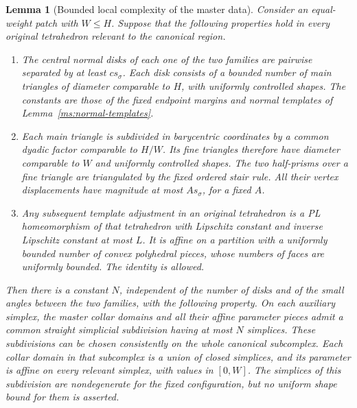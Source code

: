 \documentclass[11pt]{article}
\numberwithin{equation}{section}
\newtheorem{lemma}[theorem]{Lemma}
\theoremstyle{definition}
\theoremstyle{remark}
\begin{document}
\begin{lemma}[Bounded local complexity of the master data]
\label{ms:bounded-complexity}
Consider an equal-weight patch with $W\leq H$.  Suppose that the following
properties hold in every original tetrahedron relevant to the canonical
region.
\begin{enumerate}
\item The central normal disks of each one of the two families are
pairwise separated by at least $c s_\sigma$.  Each disk consists of a
bounded number of main triangles of diameter comparable to $H$, with
uniformly controlled shapes.  The constants are those of the fixed
endpoint margins and normal templates of
Lemma~\ref{ms:normal-templates}.
\item Each main triangle is subdivided in barycentric coordinates by a
common dyadic factor comparable to $H/W$.  Its fine triangles therefore
have diameter comparable to $W$ and uniformly controlled shapes.
The two half-prisms over a fine triangle are triangulated by the fixed
ordered stair rule.  All their vertex displacements have magnitude at
most $A s_\sigma$, for a fixed $A$.
\item Any subsequent template adjustment in an original tetrahedron is
a PL homeomorphism of that tetrahedron with Lipschitz constant and
inverse Lipschitz constant at most $L$.  It is affine on a partition
with a uniformly bounded number of convex polyhedral pieces, whose
numbers of faces are uniformly bounded.  The identity is allowed.
\end{enumerate}
Then there is a constant $N$, independent of the number of disks and
of the small angles between the two families, with the following
property.  On each auxiliary simplex, the master collar domains and
all their affine parameter pieces admit a common straight simplicial
subdivision having at most $N$ simplices.  These subdivisions can be
chosen consistently on the whole canonical subcomplex.  Each collar
domain in that subcomplex is a union of closed simplices, and its
parameter is affine on every relevant simplex, with values in $[0,W]$.
The simplices of this subdivision are nondegenerate for the fixed
configuration, but no uniform shape bound for them is asserted.
\end{lemma}
\end{document}
